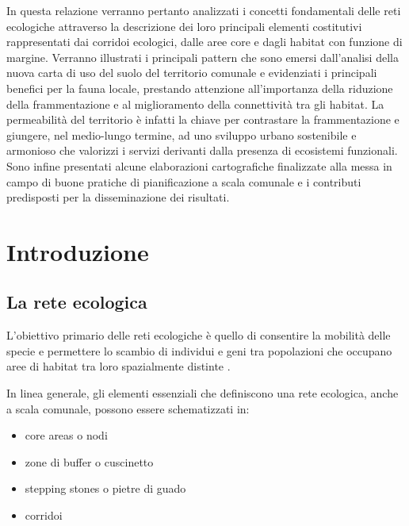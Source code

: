 \documentclass[
]{book}
\providecommand{\tightlist}{%
  \setlength{\itemsep}{0pt}\setlength{\parskip}{0pt}}
\begin{document}
In questa relazione verranno pertanto analizzati i concetti fondamentali delle reti ecologiche attraverso la descrizione dei loro principali elementi costitutivi rappresentati dai corridoi ecologici, dalle aree core e dagli habitat con funzione di margine. Verranno illustrati i principali pattern che sono emersi dall'analisi della nuova carta di uso del suolo del territorio comunale e evidenziati i principali benefici per la fauna locale, prestando attenzione all'importanza della riduzione della frammentazione e al miglioramento della connettività tra gli habitat. La permeabilità del territorio è infatti la chiave per contrastare la frammentazione e giungere, nel medio-lungo termine, ad uno sviluppo urbano sostenibile e armonioso che valorizzi i servizi derivanti dalla presenza di ecosistemi funzionali. Sono infine presentati alcune elaborazioni cartografiche finalizzate alla messa in campo di buone pratiche di pianificazione a scala comunale e i contributi predisposti per la disseminazione dei risultati.

\chapter{Introduzione}\label{introduzione}

\section{La rete ecologica}\label{la-rete-ecologica}

L'obiettivo primario delle reti ecologiche è quello di consentire la
mobilità delle specie e permettere lo scambio di individui e geni tra
popolazioni che occupano aree di habitat tra loro spazialmente distinte
\citep{battistiFrammentazioneAmbientaleConnettivita2004}.

In linea generale, gli elementi essenziali che definiscono una rete
ecologica, anche a scala comunale, possono essere schematizzati in:

\begin{itemize}
\tightlist
\item
  core areas o nodi
\item
  zone di buffer o cuscinetto
\item
  stepping stones o pietre di guado
\item
  corridoi
\end{itemize}
\end{document}
